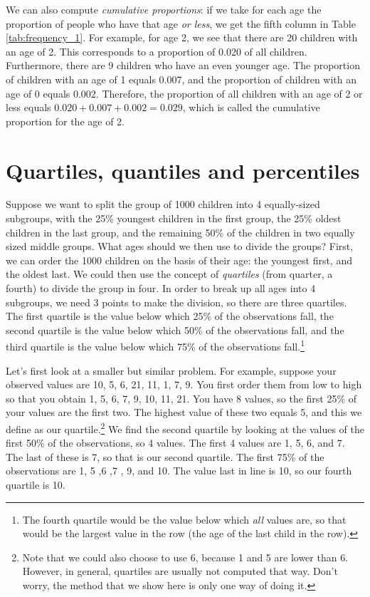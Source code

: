 \documentclass[]{report}\usepackage[]{graphicx}\usepackage[]{color}
\begin{document}
We can also compute \textit{cumulative proportions}: if we take for each age the proportion of people who have that age \textit{or less}, we get the fifth column in Table \ref{tab:frequency_1}. For example, for age 2, we see that there are 20 children with an age of 2. This corresponds to a proportion of 0.020 of all children. Furthermore, there are 9 children who have an even younger age. The proportion of children with an age of 1 equals 0.007, and the proportion of children with an age of 0 equals 0.002. Therefore, the proportion of all children with an age of 2 or less equals $0.020+0.007+0.002=0.029$, which is called the cumulative proportion for the age of 2.



\section{Quartiles, quantiles and percentiles}

Suppose we want to split the group of 1000 children into 4 equally-sized subgroups, with the 25\% youngest children in the first group, the 25\% oldest children in the last group, and the remaining 50\% of the children in two equally sized middle groups. What ages should we then use to divide the groups? First, we can order the 1000 children on the basis of their age: the youngest first, and the oldest last. We could then use the concept of \textit{quartiles} (from quarter, a fourth) to divide the group in four. In order to break up all ages into 4 subgroups, we need 3 points to make the division, so there are three quartiles. The first quartile is the value below which 25\% of the observations fall, the second quartile is the value below which 50\% of the observations fall, and the third quartile is the value below which 75\% of the observations fall.\footnote{The fourth quartile would be the value below which \textit{all} values are, so that would be the largest value in the row (the age of the last child in the row).}

Let's first look at a smaller but similar problem. For example, suppose your observed values are {10, 5, 6, 21, 11, 1, 7, 9}. You first order them from low to high so that you obtain {1, 5, 6, 7, 9, 10, 11, 21}. You have 8 values, so the first 25\% of your values are the first two. The highest value of these two equals 5, and this we define as our quartile.\footnote{Note that we could also choose to use 6,
because 1 and 5 are lower than 6. However, in general, quartiles are usually not computed that way. Don't worry, the method that we show here is only one way of doing it.} We find the second quartile by looking at the values of the first 50\% of the observations, so 4 values. The first 4 values are 1, 5, 6, and 7. The last of these is 7, so that is our second quartile. The first 75\% of the observations are 1, 5 ,6 ,7 , 9, and 10. The value last in line is 10, so our fourth quartile is 10.
\end{document}
